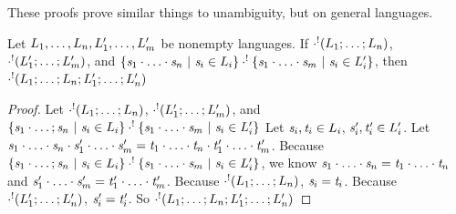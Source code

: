 \documentclass[acmsmall]{acmart}
\begin{document}
These proofs prove similar things to unambiguity, but on general languages.

\begin{lemma}
  \label{lem:potentially-empty-concat-implication}
  Let $L_1,\ldots,L_n,L_1',\ldots,L_m'$ be
  nonempty languages.
  If $\cdot^!(L_1;\ldots;L_n)$,
  $\cdot^!(L_1';\ldots;L_m')$, and
  $\{\mathit{s}_1\cdot\ldots\cdot\mathit{s}_n ~|~ \mathit{s}_i \in
    L_i\} \cdot^!
  \{\mathit{s}_1\cdot\ldots\cdot\mathit{s}_m ~|~ \mathit{s}_i \in
    L_i'\}$, then
  $\cdot^!(L_1;\ldots;L_n;L_1';\ldots;L_n')$
\end{lemma}
\begin{proof}
  Let $\cdot^!(L_1;\ldots;L_n)$,
  $\cdot^!(L_1';\ldots;L_m')$, and
  $\{\mathit{s}_1\cdot\ldots;\mathit{s}_n ~|~ \mathit{s}_i \in
    L_i\} \cdot^!
  \{\mathit{s}_1\cdot\ldots\cdot\mathit{s}_m ~|~ \mathit{s}_i \in
    L_i'\}$
  Let $\mathit{s}_i,\mathit{t}_i\in L_i$,
  $\mathit{s}_i',\mathit{t}_i'\in L_i'$.
  Let
  $\mathit{s}_1\cdot\ldots\cdot\mathit{s}_n\cdot\mathit{s}_1'\cdot\ldots\cdot\mathit{s}_m'
  =
  \mathit{t}_1\cdot\ldots\cdot\mathit{t}_n\cdot\mathit{t}_1'\cdot\ldots\cdot\mathit{t}_m'$.
  Because $\{\mathit{s}_1\cdot\ldots;\mathit{s}_n ~|~ \mathit{s}_i \in
    L_i\} \cdot^!
  \{\mathit{s}_1\cdot\ldots\cdot\mathit{s}_m ~|~ \mathit{s}_i \in
    L_i'\}$, we know
  $\mathit{s}_1\cdot\ldots\cdot\mathit{s}_n =
  \mathit{t}_1\cdot\ldots\cdot\mathit{t}_n$ and
  $\mathit{s}_1'\cdot\ldots\cdot\mathit{s}_m' =
  \mathit{t}_1'\cdot\ldots\cdot\mathit{t}_m'$.
  Because $\cdot^!(L_1;\ldots;L_n)$,
  $\mathit{s}_i = \mathit{t}_i$.
  Because $\cdot^!(L_1';\ldots;L_n')$,
  $\mathit{s}_i' = \mathit{t}_i'$.
  So
  $\cdot^!(L_1;\ldots;L_n;L_1';\ldots;L_n')$
\end{proof}
\end{document}
